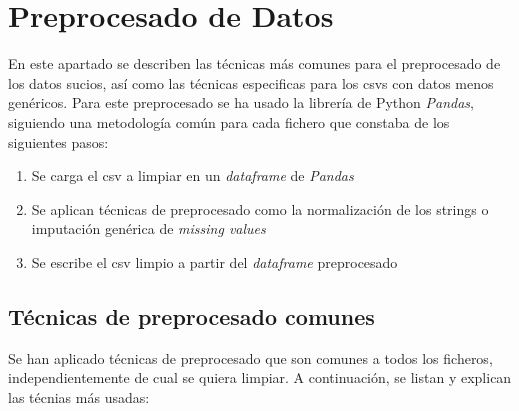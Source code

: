 \documentclass[]{article}
\begin{document}
\newpage
\lstset{style=python}
\section{Preprocesado de Datos}
\label{sec:preprocesado}
En este apartado se describen las técnicas más comunes para el preprocesado de los datos sucios, así como las técnicas especificas para los csvs con datos menos genéricos. Para este preprocesado se ha usado la librería de Python \textit{Pandas}, siguiendo una metodología común para cada fichero que constaba de los siguientes pasos:

\begin{enumerate}
    \item Se carga el csv a limpiar en un \textit{dataframe} de \textit{Pandas}
    \item Se aplican técnicas de preprocesado como la normalización de los strings o imputación genérica de \textit{missing values}
    \item Se escribe el csv limpio a partir del \textit{dataframe} preprocesado
\end{enumerate}

\subsection{Técnicas de preprocesado comunes}
\label{subsec:preprocesadocomun}
Se han aplicado técnicas de preprocesado que son comunes a todos los ficheros, independientemente de cual se quiera limpiar. A continuación, se listan y explican las técnias más usadas:
\end{document}
